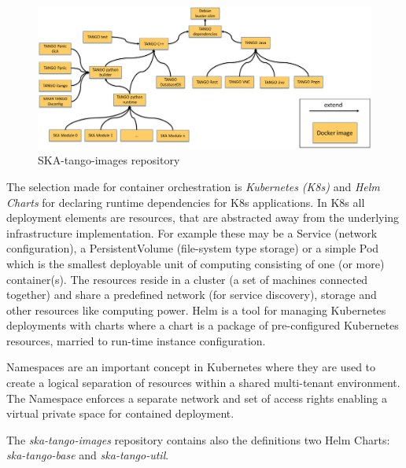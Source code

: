 \documentclass[a4paper,
               keeplastbox,   %
               ]{jacow}
\begin{document}
\begin{figure}[!htb]
   \centering
   \includegraphics*[width=0.8\columnwidth]{ska-tango-images}
   \caption{SKA-tango-images repository}
   \label{fig:ska-tango-images}
\end{figure}

The selection made for container orchestration is \textit{Kubernetes (K8s)}\cite{kubernetes} and \textit{Helm Charts}\cite{helm} for declaring runtime dependencies for K8s applications. In K8s all deployment elements are resources, that are abstracted away from the underlying infrastructure implementation. For example these may be a Service (network configuration), a PersistentVolume (file-system type storage) or a simple Pod which is the smallest deployable unit of computing consisting of one (or more) container(s). The resources reside in a cluster (a set of machines connected together) and share a predefined network (for service discovery), storage and other resources like computing power. 
Helm is a tool for managing Kubernetes deployments with charts where a chart is a package of pre-configured Kubernetes resources, married to run-time instance configuration.  

Namespaces are an important concept in Kubernetes where they are used to create a logical separation of resources within a shared multi-tenant environment. The Namespace enforces a separate network and set of access rights enabling a virtual private space for contained deployment.

The \textit{ska-tango-images} repository contains also the definitions two Helm Charts: \textit{ska-tango-base} and \textit{ska-tango-util}.
\end{document}

